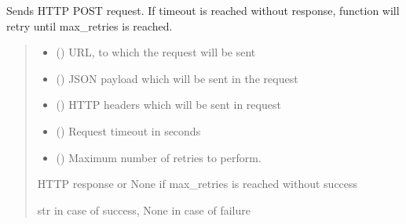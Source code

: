 \documentclass[letterpaper,10pt,english]{sphinxmanual}
\begin{document}

\begin{fulllineitems}
\label{\detokenize{llm_utils:llm_utils.post_with_retries}}
\pysigstartsignatures
\pysiglinewithargsret
{}
{\sphinxparamcomma {}\sphinxparamcomma {}\sphinxparamcomma {}\sphinxparamcomma {}}
{}
\pysigstopsignatures
\sphinxAtStartPar
Sends HTTP POST request. If timeout is reached without response, function will retry until max\_retries is reached.
\begin{quote}\begin{description}
\begin{itemize}
\item {} 
\sphinxAtStartPar
{} () \textendash{} URL, to which the request will be sent

\item {} 
\sphinxAtStartPar
{} () \textendash{} JSON payload which will be sent in the request

\item {} 
\sphinxAtStartPar
{} () \textendash{} HTTP headers which will be sent in request

\item {} 
\sphinxAtStartPar
{} () \textendash{} Request timeout in seconds

\item {} 
\sphinxAtStartPar
{} () \textendash{} Maximum number of retries to perform.

\end{itemize}

\sphinxAtStartPar
HTTP response or None if max\_retries is reached without success

\sphinxAtStartPar
str in case of success, None in case of failure

\end{description}\end{quote}

\end{fulllineitems}
\end{document}

